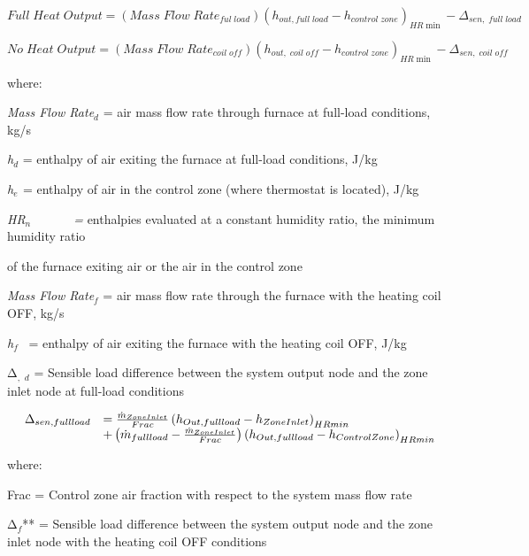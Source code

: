 \begin{equation}
Full\;Heat\;Output = (Mass\;Flow\;Rat{e_{ful\;load}}){({h_{out,full\;load}} - {h_{control\;zone}})_{HR\min }} - {\Delta_{sen,\;full\;load}}
\end{equation}

\begin{equation}
No\;Heat\;Output = (Mass\;Flow\;Rat{e_{coil\;off}}){({h_{out,\;coil\;off}} - {h_{control\;zone}})_{HR\min }} - {\Delta_{sen,\;coil\;off}}
\end{equation}

where:

\emph{Mass Flow Rate\(_{d}\)} = air mass flow rate through furnace at full-load conditions, kg/s

\emph{h\(_{d}\)} = enthalpy of air exiting the furnace at full-load conditions, J/kg

\emph{h\(_{e}\)}\(_{ }\) = enthalpy of air in the control zone (where thermostat is located), J/kg

\emph{HR\(_{n}\)~~~~~~ =} enthalpies evaluated at a constant humidity ratio, the minimum humidity ratio

of the furnace exiting air or the air in the control zone

\emph{Mass Flow Rate\(_{f}\)} = air mass flow rate through the furnace with the heating coil OFF, kg/s

\emph{h\(_{f}\)}~ = enthalpy of air exiting the furnace with the heating coil OFF, J/kg

Δ\(_{,}\) \emph{\(_{d}\)} = Sensible load difference between the system output node and the zone inlet node at full-load conditions

\begin{equation}
  \begin{array}{rl}
    \Delta_{sen,full load} &= \frac{\dot{m}_{ZoneInlet}}{Frac} \PB{h_{Out,full load} - h_{ZoneInlet}}_{HRmin} \\
                           &+ \PB{\dot{m}_{full load} - \frac{\dot{m}_{ZoneInlet}}{Frac}} \PB{h_{Out,full load} - h_{ControlZone}}_{HRmin}
  \end{array}
\end{equation}

where:

Frac = Control zone air fraction with respect to the system mass flow rate

Δ\(_{f}\)** = Sensible load difference between the system output node and the zone inlet node with the heating coil OFF conditions

